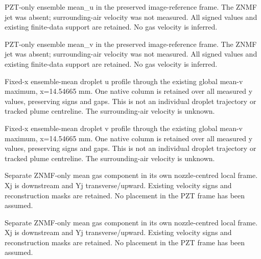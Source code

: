 \caption{PZT-only ensemble mean\_u in the preserved image-reference frame. The ZNMF jet was absent; surrounding-air velocity was not measured. All signed values and existing finite-data support are retained. No gas velocity is inferred.}

\caption{PZT-only ensemble mean\_v in the preserved image-reference frame. The ZNMF jet was absent; surrounding-air velocity was not measured. All signed values and existing finite-data support are retained. No gas velocity is inferred.}

\caption{Fixed-x ensemble-mean droplet u profile through the existing global mean-v maximum, x=14.54665 mm. One native column is retained over all measured y values, preserving signs and gaps. This is not an individual droplet trajectory or tracked plume centreline. The surrounding-air velocity is unknown.}

\caption{Fixed-x ensemble-mean droplet v profile through the existing global mean-v maximum, x=14.54665 mm. One native column is retained over all measured y values, preserving signs and gaps. This is not an individual droplet trajectory or tracked plume centreline. The surrounding-air velocity is unknown.}

\caption{Separate ZNMF-only mean gas component in its own nozzle-centred local frame. Xj is downstream and Yj transverse/upward. Existing velocity signs and reconstruction masks are retained. No placement in the PZT frame has been assumed.}

\caption{Separate ZNMF-only mean gas component in its own nozzle-centred local frame. Xj is downstream and Yj transverse/upward. Existing velocity signs and reconstruction masks are retained. No placement in the PZT frame has been assumed.}

